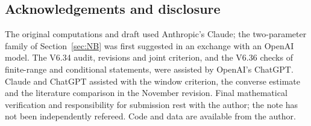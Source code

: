\documentclass[11pt]{amsart}
\theoremstyle{remark}
\theoremstyle{definition}
\begin{document}
\subsection*{Acknowledgements and disclosure}
The original computations and draft used Anthropic's Claude; the two-parameter family of Section~\ref{sec:NB} was first suggested in an exchange with an OpenAI model. The V6.34 audit, revisions and joint criterion, and the V6.36 checks of finite-range and conditional statements, were assisted by OpenAI's ChatGPT. Claude and ChatGPT assisted with the window criterion, the converse estimate and the literature comparison in the November revision. Final mathematical verification and responsibility for submission rest with the author; the note has not been independently refereed. Code and data are available from the author.
\end{document}
